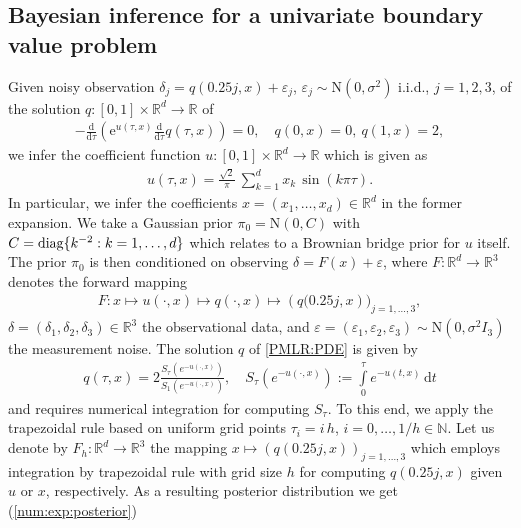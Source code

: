 \documentclass[sn-mathphys-num]{sn-jnl}%
\theoremstyle{thmstyleone}%
\theoremstyle{thmstyletwo}%
\theoremstyle{thmstylethree}%
\newcommand{\change}[1]{\bgroup\color{black}#1\egroup}    %
\begin{document}
\subsection{\change{Bayesian inference for a univariate boundary value problem}}\label{sec:BIP1}
Given noisy observation $\delta_j = q(0.25j, x)+\varepsilon_j$, $\varepsilon_j \sim \mathrm{N}(0,\sigma^2)$ i.i.d., $j=1,2,3$, of the solution $q\colon[0,1]\times \mathbb R^d\to\mathbb R$ of %
\begin{align}\label{PMLR:PDE}
	- \frac{\text{d}}{\text{d} \tau} \left(\mathrm{e}^{u(\tau, x)} \frac{\text{d}}{\text{d} \tau} q(\tau, x)\right) = 0, 
	\quad q(0, x)=0, \ q(1, x)=2,	
\end{align}
we infer the coefficient function $u\colon [0,1]\times \mathbb R^d\to\mathbb R$ which is given as 
\begin{align*}%
   u(\tau, x)=\frac{\sqrt{2}}{\pi} \ \sum_{k=1}^{d} x_k \, \sin(k\pi \tau). %
\end{align*}
In particular, we infer the coefficients $x=(x_1,\ldots,x_d)\in\mathbb R^d$ in the former expansion.
We take a Gaussian prior $\pi_0 = \mathrm{N}(0, C)$ with $C=\textmd{diag}\{k^{-2}: k=1,\dots,d\}$ which relates to a Brownian bridge prior for $u$ itself.
The prior $\pi_0$ is then conditioned on observing $\delta=F(x)+\varepsilon$, where $F: \mathbb{R}^d \rightarrow \mathbb{R}^3$ denotes the forward mapping
\begin{align*}
	F \colon x \mapsto u(\cdot, x) \mapsto q(\cdot, x) \mapsto \left(q(0.25j, x\right))_{j=1,\ldots,3},
\end{align*}
$\delta=(\delta_1,\delta_2,\delta_3) \in \mathbb R^3$ the observational data, and $\varepsilon=(\varepsilon_1, \varepsilon_2, \varepsilon_3) \sim \mathrm{N}(0,\sigma^2 I_3)$ the measurement noise.
The solution $q$ of \eqref{PMLR:PDE} is given by
\begin{align*}%
	q(\tau, x)= 2\frac{S_{\tau}(e^{-u(\cdot, x)})}{S_1(e^{-u(\cdot, x)})}, \quad S_{\tau}(e^{-u(\cdot, x)}) :=\int\limits_0^{\tau} e^{-u(t, x)}\, \mathrm{d}t	
\end{align*}
and requires numerical integration for computing $S_{\tau}$.
To this end, we apply the trapezoidal rule based on uniform grid points $\tau_i = i\,h$, $i=0,\ldots, 1/h \in \mathbb N$.
Let us denote by $F_h\colon \mathbb R^d \to \mathbb R^3$ the mapping $x \mapsto \left(q(0.25j, x)\right)_{j=1,\ldots,3}$ which employs integration by trapezoidal rule with grid size $h$ for computing $q(0.25j, x)$ given $u$ or $x$, respectively. As a resulting posterior distribution we get (\ref{num:exp:posterior})
\end{document}
